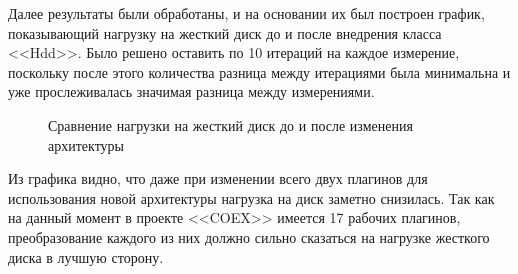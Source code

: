 Далее результаты были обработаны, и на основании их был построен график, показывающий нагрузку на жесткий диск до и после внедрения класса <<Hdd>>. Было решено оставить по 10 итераций на каждое измерение, поскольку после этого количества разница между итерациями была минимальна и уже прослеживалась значимая разница между измерениями.

\begin{figure}[!ht]
\caption{ Сравнение нагрузки на жесткий диск до и после изменения архитектуры }
\label{bok_5:bok_5}
\end{figure}

Из графика видно, что даже при изменении всего двух плагинов для использования новой архитектуры нагрузка на диск заметно снизилась. Так как на данный момент в проекте <<COEX>> имеется 17 рабочих плагинов, преобразование каждого из них должно сильно сказаться на нагрузке жесткого диска в лучшую сторону.

\clearpage
